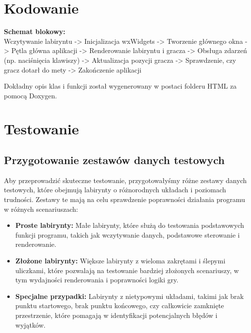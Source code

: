\documentclass{article}
\begin{document}
\section{Kodowanie} 
\textbf{Schemat blokowy: }
\\
Wczytywanie labiryntu -> Inicjalizacja wxWidgets -> Tworzenie głównego okna -> Pętla główna aplikacji -> Renderowanie labiryntu i gracza -> Obsługa zdarzeń (np. naciśnięcia klawiszy) -> Aktualizacja pozycji gracza -> Sprawdzenie, czy gracz dotarł do mety -> Zakończenie aplikacji

Dokładny opis klas i funkcji został wygenerowany w postaci folderu HTML za pomocą Doxygen.
\section{Testowanie}

\subsection{Przygotowanie zestawów danych testowych}
Aby przeprowadzić skuteczne testowanie, przygotowałyśmy różne zestawy danych testowych, które obejmują labirynty o różnorodnych układach i poziomach trudności. Zestawy te mają na celu sprawdzenie poprawności działania programu w różnych scenariuszach:
\begin{itemize}
    \item \textbf{Proste labirynty:} Małe labirynty, które służą do testowania podstawowych funkcji programu, takich jak wczytywanie danych, podstawowe sterowanie i renderowanie.
    \item \textbf{Złożone labirynty:} Większe labirynty z wieloma zakrętami i ślepymi uliczkami, które pozwalają na testowanie bardziej złożonych scenariuszy, w tym wydajności renderowania i poprawności logiki gry.
    \item \textbf{Specjalne przypadki:} Labirynty z nietypowymi układami, takimi jak brak punktu startowego, brak punktu końcowego, czy całkowicie zamknięte przestrzenie, które pomagają w identyfikacji potencjalnych błędów i wyjątków.
\end{itemize}
\end{document}
